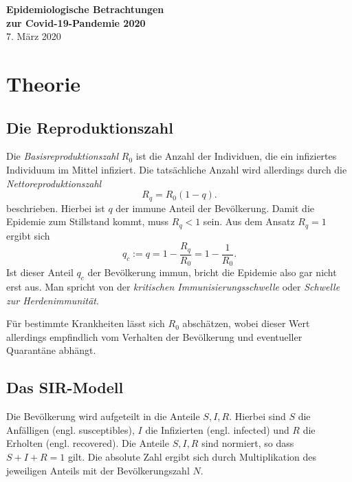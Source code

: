 \documentclass[a4paper,11pt,fleqn,twocolumn,twoside,dvipdfmx]{scrartcl}
\numberwithin{equation}{section}
\begin{document}
\noindent
{\Large\textbf{Epidemiologische Betrachtungen\\
zur Covid-19-Pandemie 2020}}\\[4pt]
7. März 2020

\tableofcontents

\section{Theorie}

\subsection{Die Reproduktionszahl}

Die \emph{Basisreproduktionszahl} $R_0$ ist die Anzahl der Individuen,
die ein infiziertes Individuum im Mittel infiziert. Die tatsächliche
Anzahl wird allerdings durch die \emph{Nettoreproduktionszahl}%
\begin{equation}\label{eq:Nettoreproduktionszahl}
R_q = R_0(1-q).
\end{equation}
beschrieben. Hierbei ist $q$ der immune Anteil der Bevölkerung.
Damit die Epidemie zum Stillstand kommt, muss $R_q<1$ sein.
Aus dem Ansatz $R_q=1$ ergibt sich%
\begin{equation}
q_c := q = 1-\frac{R_q}{R_0} = 1-\frac{1}{R_0}.
\end{equation}
Ist dieser Anteil $q_c$ der Bevölkerung immun, bricht die Epidemie
also gar nicht erst aus. Man spricht von der
\emph{kritischen Immunisierungsschwelle} oder \emph{Schwelle
zur Herdenimmunität}.

Für bestimmte Krankheiten lässt sich $R_0$ abschätzen, wobei
dieser Wert allerdings empfindlich vom Verhalten der Bevölkerung und
eventueller Quarantäne abhängt.


\subsection{Das SIR-Modell}

Die Bevölkerung wird aufgeteilt in die Anteile $S,I,R$. Hierbei sind
$S$ die Anfälligen (engl. susceptibles), $I$ die Infizierten (engl.
infected) und $R$ die Erholten (engl. recovered). Die Anteile
$S,I,R$ sind normiert, so dass $S+I+R=1$ gilt. Die absolute Zahl
ergibt sich durch Multiplikation des jeweiligen Anteils mit der
Bevölkerungszahl $N$.
\end{document}
